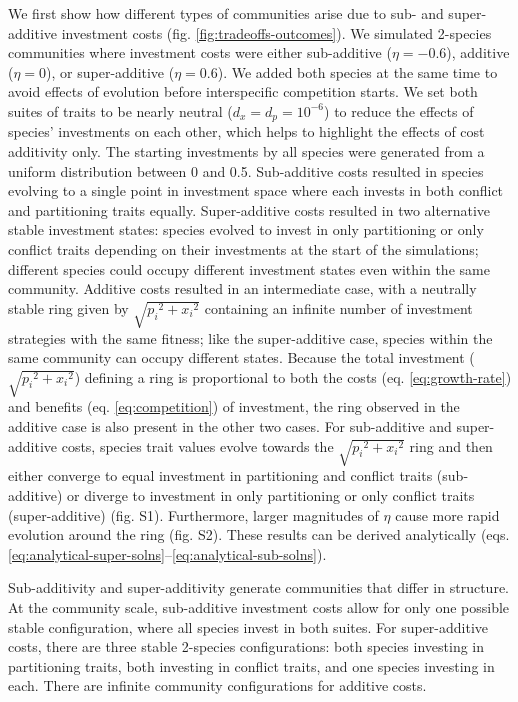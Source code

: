 We first show how different types of communities arise due to sub- and
super-additive investment costs (fig. \ref{fig:tradeoffs-outcomes}). 
We simulated 2-species communities
where investment costs were either sub-additive ($\eta = - 0.6$),
additive ($\eta = 0$), or super-additive ($\eta = 0.6$). We added
both species at the same time to avoid effects of evolution before
interspecific competition starts. We set both suites of traits to be
nearly neutral ($d_{x} = d_{p} = 10^{- 6}$) to reduce the effects of 
species’ investments on each other, which helps to highlight the effects of 
cost additivity only.
The starting investments
by all species were generated from a uniform distribution between 0 and
0.5. Sub-additive costs resulted in species evolving to a single point
in investment space where each invests in both conflict and partitioning 
traits equally. Super-additive costs resulted in two
alternative stable investment states: species evolved to invest in only
partitioning or only conflict traits depending on their investments at
the start of the simulations; different species could occupy different
investment states even within the same community.
Additive costs resulted in an intermediate
case, with a neutrally stable ring given by
$\sqrt{{p_{i}}^{2} + {x_{i}}^{2}}$ containing an infinite number of
investment strategies with the same fitness; like the super-additive case,
species within the same community can occupy different states.
Because the total investment ($\sqrt{{p_{i}}^{2} + {x_{i}}^{2}}$) 
defining a ring is proportional to both the costs (eq. \ref{eq:growth-rate})
and benefits (eq. \ref{eq:competition}) of investment, the ring observed in
the additive case is also present in the other two cases.
For sub-additive and super-additive costs, species trait values evolve
towards the $\sqrt{{p_{i}}^{2} + {x_{i}}^{2}}$ ring and then either
converge to equal investment in partitioning and conflict traits
(sub-additive) or diverge to investment in only partitioning or only
conflict traits (super-additive) (fig. S1).
Furthermore, larger magnitudes of $\eta$ cause more rapid evolution around
the ring (fig. S2).
These results can be derived analytically
(eqs. \ref{eq:analytical-super-solns}--\ref{eq:analytical-sub-solns}).


Sub-additivity and super-additivity generate communities that differ in
structure. At the community scale, sub-additive investment costs allow
for only one possible stable configuration, where all species invest in
both suites. For super-additive costs, there are three stable 2-species
configurations: both species investing in partitioning traits, both
investing in conflict traits, and one species investing in each. There
are infinite community configurations for additive costs.

